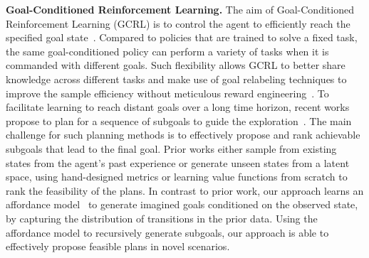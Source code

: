 \textbf{Goal-Conditioned Reinforcement Learning.} The aim of Goal-Conditioned Reinforcement Learning (GCRL) is to control the agent to efficiently reach the specified goal state~\cite{Kaelbling1993LearningTA, Schaul2015UniversalVF, Eysenbach2021CLearningLT}. Compared to policies that are trained to solve a fixed task, the same goal-conditioned policy can perform a variety of tasks when it is commanded with different goals. Such flexibility allows GCRL to better share knowledge across different tasks and make use of goal relabeling techniques to improve the sample efficiency without meticulous reward engineering~\cite{Andrychowicz2017HindsightER, Pong2020SkewFitSS, Fang2019CurriculumguidedHE, Ding2019GoalconditionedIL, Gupta2019RelayPL, Sun2019PolicyCW, Eysenbach2020RewritingHW, Ghosh2021LearningTR}. To facilitate learning to reach distant goals over a long time horizon, recent works propose to plan for a sequence of subgoals to guide the exploration~\cite{Nasiriany2019PlanningWG, Eysenbach2019SearchOT, Charlesworth2020PlanGANMP, Pertsch2020LongHorizonVP, Sharma2021AutonomousRL, Zhang2021CPlanningAA}. The main challenge for such planning methods is to effectively propose and rank achievable subgoals that lead to the final goal. Prior works either sample from existing states from the agent's past experience
or generate unseen states from a latent space,
using hand-designed metrics or learning value functions from scratch to rank the feasibility of the plans. In contrast to prior work, our approach learns an affordance model~\cite{Nair2018VisualRL, Nair2019ContextualIG, Khazatsky2021WhatCI, ChaneSane2021GoalConditionedRL}
to generate imagined goals conditioned on the observed state, by capturing the distribution of transitions in the prior data. Using the affordance model to recursively generate subgoals, our approach is able to effectively propose feasible plans in novel scenarios. 

